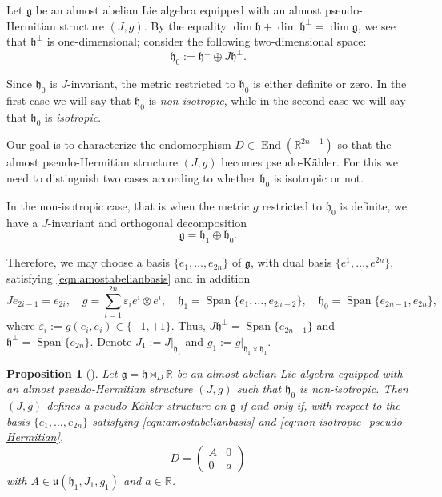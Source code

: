 \documentclass{article}
\newtheorem{proposition}[theorem]{Proposition}
\theoremstyle{definition}
\DeclareMathOperator{\End}{End}
\newcommand{\R}{\mathbb{R}}
\newcommand{\frg}{\mathfrak{g}}
\newcommand{\frh}{\mathfrak{h}}
\newcommand{\Span}[1]{\operatorname{Span}\{#1\}}
\newcommand{\lie}[1]{\mathfrak{#1}}
\newcommand{\g}{\lie g}
\newcommand{\h}{\lie h}
\begin{document}
Let $\frg$ be an almost abelian Lie algebra equipped with an almost pseudo-Hermitian structure $(J,g)$. By the equality $\dim\frh+\dim\frh^\perp=\dim\frg$, we see that $\frh^\perp$ is one-dimensional; consider the following two-dimensional space: $$\lie h_0:=\lie h^\perp\oplus J\lie h^\perp.$$

Since $\frh_0$ is $J$-invariant, the metric restricted to $\lie h_0$ is either definite or zero. In the first case we will say that $\frh_0$ is \emph{non-isotropic}, while in the second case we will say that $\frh_0$ is \emph{isotropic}.\medskip

Our goal is to characterize the endomorphism $D\in\End(\R^{2n-1})$ so that the almost pseudo-Hermitian structure $(J,g)$ becomes pseudo-Kähler. For this we need to distinguish two cases according to whether $\lie{h}_0$ is isotropic or not.\medskip

In the non-isotropic case, that is when the metric $g$ restricted to $\frh_0$ is definite, we have a $J$-invariant and orthogonal decomposition $$\g=\h_1\oplus \h_0.$$

Therefore, we may choose a basis $\{e_1,\dotsc, e_{2n}\}$ of $\frg$, with dual basis $\{e^1,\dotsc, e^{2n}\}$, satisfying \eqref{eqn:amostabelianbasis} and in addition \begin{equation}\label{eq:non-isotropic_pseudo-Hermitian}
    Je_{2i-1}=e_{2i}, \quad g=\sum_{i=1}^{2n}\varepsilon_i e^i\otimes e^i, \quad \lie h_1=\Span{e_1,\dotsc, e_{2n-2}}, \quad \lie h_0=\Span{e_{2n-1},e_{2n}},
\end{equation} where $\varepsilon_i:=g(e_i,e_i)\in\{-1,+1\}$. Thus, $J\frh^\perp=\Span{e_{2n-1}}$ and $\frh^\perp=\Span{e_{2n}}$. Denote $J_1:=J|_{\frh_1}$ and $g_1:=g|_{\frh_1\times\frh_1}$.

\begin{proposition}[]\label{prop:characterization_non-isotropic_case}
    Let $\frg=\frh\rtimes_D\R$ be an almost abelian Lie algebra equipped with an almost pseudo-Hermitian structure $(J,g)$ such that $\lie h_0$ is non-isotropic. Then $(J,g)$ defines a pseudo-Kähler structure on $\frg$ if and only if, with respect to the basis $\{e_1,\dotsc, e_{2n}\}$ satisfying \eqref{eqn:amostabelianbasis} and \eqref{eq:non-isotropic_pseudo-Hermitian},
    \begin{equation}\label{eq:D_positive_g0}
        D=\begin{pmatrix}
            A&0\\
            0&a
        \end{pmatrix}
    \end{equation} with $A\in\mathfrak{u}(\frh_1,J_1,g_1)$ and $a\in\R$.
\end{proposition}
\end{document}
